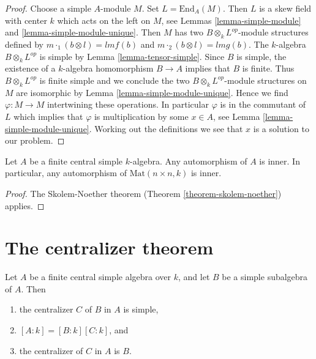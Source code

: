 \begin{proof}
Choose a simple $A$-module $M$. Set $L = \text{End}_A(M)$.
Then $L$ is a skew field with center $k$ which acts on the left on $M$, see
Lemmas \ref{lemma-simple-module} and \ref{lemma-simple-module-unique}.
Then $M$ has two $B \otimes_k L^{op}$-module structures defined by
$m \cdot_1 (b \otimes l) = lmf(b)$ and $m \cdot_2 (b \otimes l) = lmg(b)$.
The $k$-algebra $B \otimes_k L^{op}$ is simple by
Lemma \ref{lemma-tensor-simple}. Since $B$ is simple, the existence of a
$k$-algebra homomorphism $B \to A$ implies that $B$ is finite. Thus
$B \otimes_k L^{op}$ is finite simple and we conclude the two
$B \otimes_k L^{op}$-module structures on $M$
are isomorphic by Lemma \ref{lemma-simple-module-unique}.
Hence we find $\varphi : M \to M$ intertwining these operations.
In particular $\varphi$ is in the commutant of $L$ which implies that
$\varphi$ is multiplication by some $x \in A$, see
Lemma \ref{lemma-simple-module-unique}. Working out the definitions we see
that $x$ is a solution to our problem.
\end{proof}

\begin{lemma}
\label{lemma-automorphism-inner}
Let $A$ be a finite central simple $k$-algebra. Any automorphism of $A$ is
inner. In particular, any automorphism of $\text{Mat}(n \times n, k)$
is inner.
\end{lemma}

\begin{proof}
The Skolem-Noether theorem (Theorem \ref{theorem-skolem-noether})
applies.
\end{proof}



\section{The centralizer theorem}
\label{section-centralizer}


\begin{theorem}
\label{theorem-centralizer}
Let $A$ be a finite central simple algebra over $k$, and let
$B$ be a simple subalgebra of $A$. Then
\begin{enumerate}
\item the centralizer $C$ of $B$ in $A$ is simple,
\item $[A : k] = [B : k][C : k]$, and
\item the centralizer of $C$ in $A$ is $B$.
\end{enumerate}
\end{theorem}


